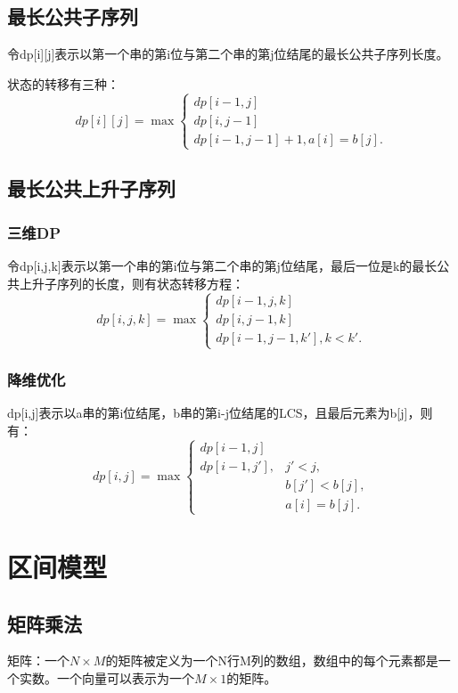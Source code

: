\subsection{最长公共子序列}
令dp[i][j]表示以第一个串的第i位与第二个串的第j位结尾的最长公共子序列长度。

状态的转移有三种：
\begin{equation*}
    dp[i][j]=\max
    \begin{cases}
        dp[i-1,j]\\
        dp[i,j-1]\\
        dp[i-1,j-1]+1,a[i]=b[j].
    \end{cases}
\end{equation*}
\subsection{最长公共上升子序列}
\subsubsection{三维DP}
令dp[i,j,k]表示以第一个串的第i位与第二个串的第j位结尾，最后一位是k的最长公共上升子序列的长度，则有状态转移方程：
\begin{equation*}
    dp[i,j,k]=\max
    \begin{cases}
        dp[i-1,j,k]\\
        dp[i,j-1,k]\\
        dp[i-1,j-1,k'], k<k'.
    \end{cases}
\end{equation*}

\subsubsection{降维优化}
dp[i,j]表示以a串的第i位结尾，b串的第i-j位结尾的LCS，且最后元素为b[j]，则有：
\begin{equation*}
    dp[i,j]=\max
    \begin{cases}
        dp[i-1,j]\\
        dp[i-1,j'],&j'<j,\\
        &b[j']<b[j],\\
        &a[i]=b[j].
    \end{cases}
\end{equation*}

\section{区间模型}
\subsection{矩阵乘法}
矩阵：一个$N\times M$的矩阵被定义为一个N行M列的数组，数组中的每个元素都是一个实数。一个向量可以表示为一个$M\times 1$的矩阵。

